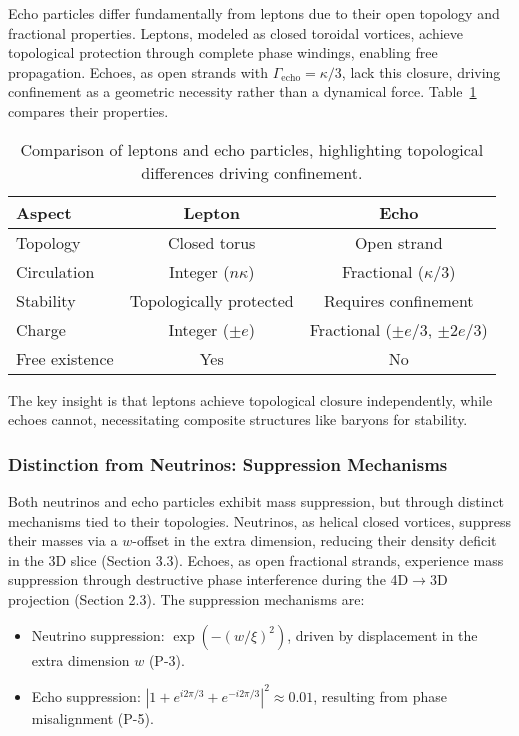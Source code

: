 Echo particles differ fundamentally from leptons due to their open topology and fractional properties. Leptons, modeled as closed toroidal vortices, achieve topological protection through complete phase windings, enabling free propagation. Echoes, as open strands with $\Gamma_{\text{echo}} = \kappa/3$, lack this closure, driving confinement as a geometric necessity rather than a dynamical force. Table~\ref{tab:echo-lepton-revised} compares their properties.

\begin{table}[h!]
\centering
\begin{tabular}{|l|c|c|}
\hline
Aspect & Lepton & Echo \\
\hline
Topology & Closed torus & Open strand \\
Circulation & Integer ($n \kappa$) & Fractional ($\kappa/3$) \\
Stability & Topologically protected & Requires confinement \\
Charge & Integer ($\pm e$) & Fractional ($\pm e/3$, $\pm 2e/3$) \\
Free existence & Yes & No \\
\hline
\end{tabular}
\caption{Comparison of leptons and echo particles, highlighting topological differences driving confinement.}
\label{tab:echo-lepton-revised}
\end{table}

The key insight is that leptons achieve topological closure independently, while echoes cannot, necessitating composite structures like baryons for stability.

\subsubsection{Distinction from Neutrinos: Suppression Mechanisms}

Both neutrinos and echo particles exhibit mass suppression, but through distinct mechanisms tied to their topologies. Neutrinos, as helical closed vortices, suppress their masses via a $w$-offset in the extra dimension, reducing their density deficit in the 3D slice (Section 3.3). Echoes, as open fractional strands, experience mass suppression through destructive phase interference during the 4D$\to$3D projection (Section 2.3). The suppression mechanisms are:

\begin{itemize}
\item Neutrino suppression: $\exp(-(w/\xi)^2)$, driven by displacement in the extra dimension $w$ (P-3).
\item Echo suppression: $|1 + e^{i 2\pi/3} + e^{-i 2\pi/3}|^2 \approx 0.01$, resulting from phase misalignment (P-5).
\end{itemize}

